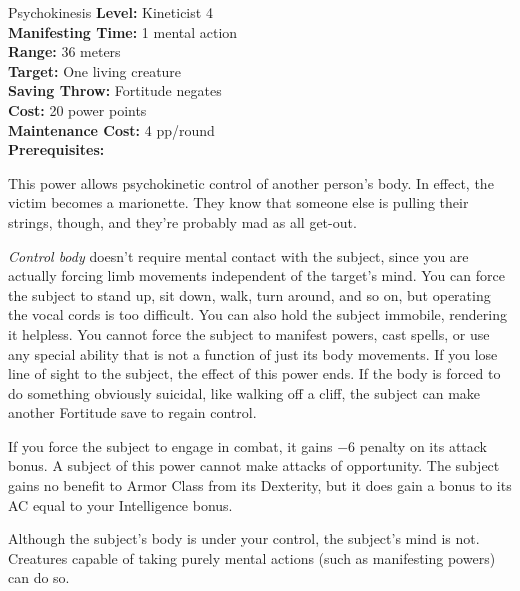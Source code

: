 {Psychokinesis}
{
	\textbf{Level:}
	Kineticist 4\\
	\textbf{Manifesting Time:}
	1 mental action\\
	\textbf{Range:}
	36 meters\\
	\textbf{Target:}
	One living creature\\
	\textbf{Saving Throw:}
	Fortitude negates\\
	\textbf{Cost:}
	20 power points\\
	\textbf{Maintenance Cost:}
	4 pp/round\\
	\textbf{Prerequisites:}
	\\
}
{
	This power allows psychokinetic control of another person's body. In effect, the victim becomes a marionette. They know that someone else is pulling their strings, though, and they're probably mad as all get-out.

	\emph{Control body} doesn't require mental contact with the subject, since you are actually forcing limb movements independent of the target's mind. You can force the subject to stand up, sit down, walk, turn around, and so on, but operating the vocal cords is too difficult. You can also hold the subject immobile, rendering it helpless. You cannot force the subject to manifest powers, cast spells, or use any special ability that is not a function of just its body movements. If you lose line of sight to the subject, the effect of this power ends. If the body is forced to do something obviously suicidal, like walking off a cliff, the subject can make another Fortitude save to regain control.

	If you force the subject to engage in combat, it gains $-6$ penalty on its attack bonus. A subject of this power cannot make attacks of opportunity. The subject gains no benefit to Armor Class from its Dexterity, but it does gain a bonus to its AC equal to your Intelligence bonus.

	Although the subject's body is under your control, the subject's mind is not. Creatures capable of taking purely mental actions (such as manifesting powers) can do so.
}